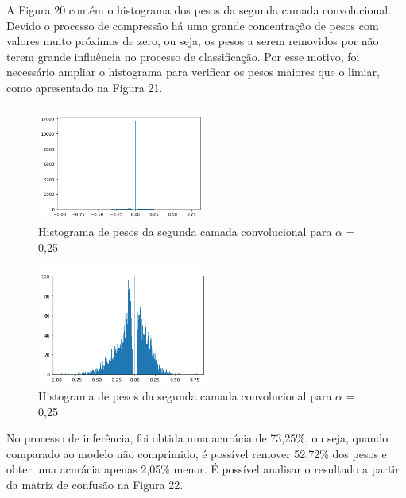 A Figura 20 contém o histograma dos pesos da segunda camada convolucional. Devido o processo de compressão há uma grande concentração de pesos com valores muito próximos de zero, ou seja, os pesos a serem removidos por não terem grande influência no processo de classificação. Por esse motivo, foi necessário ampliar o histograma para verificar os pesos maiores que o limiar, como apresentado na Figura 21. 


\begin{figure}[H]
	\includegraphics[width=0.5\textwidth, keepaspectratio=true]{figuras/CAP4/hist1_025_.png}
	\centering
	\caption[Histograma de pesos da segunda camada convolucional para $\alpha$ = 0,25]{Histograma de pesos da segunda camada convolucional para $\alpha$ = 0,25}
\end{figure}

\begin{figure}[H]
	\includegraphics[width=0.5\textwidth, keepaspectratio=true]{figuras/CAP4/hist2_025_.png}
	\centering
	\caption[Histograma ampliado de pesos da segunda camada convolucional para $\alpha$ = 0,25]{Histograma de pesos da segunda camada convolucional para $\alpha$ = 0,25}
\end{figure}

No processo de inferência, foi obtida uma acurácia de 73,25\%, ou seja, quando comparado ao modelo não comprimido, é possível remover 52,72\% dos pesos e obter uma acurácia apenas 2,05\% menor. É possível analisar o resultado a partir da matriz de confusão na Figura  22.


